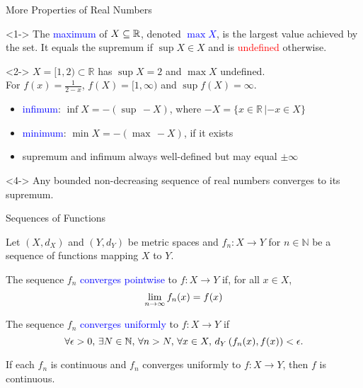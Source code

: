 \documentclass[10pt,english]{beamer}
\begin{document}
\begin{frame}{More Properties of Real Numbers}

\begin{definition}<1->
The \textcolor{blue}{maximum} of $X\subseteq \mathbb{R}$, denoted \textcolor{blue}{$\max X$}, is the largest value achieved by the set.
It equals the supremum if $\sup X \in X$ and is \textcolor{red}{undefined} otherwise.
\end{definition}

\begin{example}<2->
$X = [1,2) \subset \mathbb{R}$ has $\sup X = 2$ and $\max X$ undefined. \\[1mm]
For $f(x)=\frac{1}{2-x}$, $f(X) = [1,\infty)$ and $\sup f(X) = \infty$.
\end{example}

\begin{itemize}
\item<3-> \textcolor{blue}{infimum}: $\inf X = - \left(\sup \, -\!X\right)$, where $-\!X = \{x\in \mathbb{R}\,|-\!x\in X\}$
\item<3-> \textcolor{blue}{minimum}: $\min X = - \left(\max \, -\!X \right)$, if it exists
\item<3-> supremum and infimum always well-defined but may equal $\pm \infty$
\end{itemize}



\begin{theorem}<4->
Any bounded non-decreasing sequence of real numbers converges to its supremum.
\end{theorem}

\end{frame}  


\begin{frame}{Sequences of Functions}

Let $(X,d_X)$ and $(Y,d_Y)$ be metric spaces and
$f_n \colon X \to Y$ for $n\in \mathbb{N}$ be a sequence of functions mapping $X$ to $Y$.

\begin{definition}
The sequence $f_n$ \textcolor{blue}{converges pointwise} to $f\colon X \to Y$ if, for all $x \in X$, \vspace{-1.5mm}
\[ \lim_{n\to \infty} f_n (x) = f(x) \vspace*{-0.5mm} \]

\end{definition}

\begin{definition}
The sequence $f_n$ \textcolor{blue}{converges uniformly} to $f \colon X \to Y$ if \vspace{-1.5mm}
\[ \forall \epsilon > 0, \, \exists N\in \mathbb{N}, \, \forall n>N, \, \forall x\in X, \, d_Y \left( f_n(x),f(x) \right) < \epsilon. \vspace*{-0.5mm} \]
\end{definition}

\begin{theorem}
If each $f_n$ is continuous and $f_n$ converges uniformly to $f \colon X \to Y$, then $f$ is continuous.
\end{theorem}

\end{frame}
\end{document}
